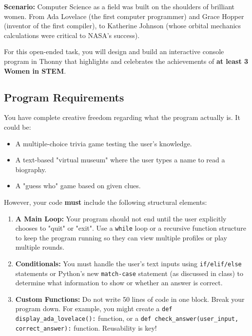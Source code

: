 \documentclass[11pt, a4paper]{article}
\begin{document}
\textbf{Scenario:} Computer Science as a field was built on the shoulders of brilliant women. From Ada Lovelace (the first computer programmer) and Grace Hopper (inventor of the first compiler), to Katherine Johnson (whose orbital mechanics calculations were critical to NASA's success). 

For this open-ended task, you will design and build an interactive console program in Thonny that highlights and celebrates the achievements of \textbf{at least 3 Women in STEM}.

\subsection*{Program Requirements}
You have complete creative freedom regarding what the program actually is. It could be:
\begin{itemize}
    \item A multiple-choice trivia game testing the user's knowledge.
    \item A text-based "virtual museum" where the user types a name to read a biography.
    \item A "guess who" game based on given clues.
\end{itemize}

However, your code \textbf{must} include the following structural elements:
\begin{enumerate}
    \item \textbf{A Main Loop:} Your program should not end until the user explicitly chooses to "quit" or "exit". Use a \texttt{while} loop or a recursive function structure to keep the program running so they can view multiple profiles or play multiple rounds.
    \item \textbf{Conditionals:} You must handle the user's text inputs using \texttt{if/elif/else} statements or Python's new \texttt{match-case} statement (as discussed in class) to determine what information to show or whether an answer is correct.
    \item \textbf{Custom Functions:} Do not write 50 lines of code in one block. Break your program down. For example, you might create a \texttt{def display\_ada\_lovelace():} function, or a \texttt{def check\_answer(user\_input, correct\_answer):} function. Reusability is key!
\end{enumerate}
\end{document}
